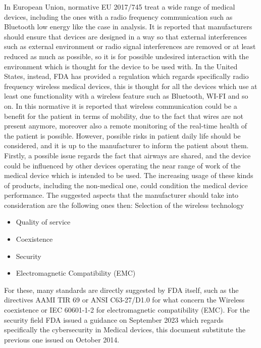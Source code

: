 \documentclass{Configuration_Files/PoliMi3i_thesis}
\begin{document}
In European Union, normative EU 2017/745 \cite{RegolamentoUE20172017} treat a wide range of medical devices, including the ones with a radio frequency communication such as Bluetooth low energy like the case in analysis. It is reported that manufacturers should ensure that devices are designed in a way so that external interferences such as external environment or radio signal interferences are removed or at least reduced as much as possible, so it is for possible undesired interaction with the environment which is thought for the device to be used with. 
In the United States, instead, FDA has provided a regulation \cite{healthWirelessMedicalDevices2023} which regards specifically radio frequency wireless medical devices, this is thought for all the devices which use at least one functionality with a wireless feature such as Bluetooth, WI-FI and so on. 
In this normative it is reported that wireless communication could be a benefit for the patient in terms of mobility, due to the fact that wires are not present anymore, moreover also a remote monitoring of the real-time health of the patient is possible. However, possible risks in patient daily life should be considered, and it is up to the manufacturer to inform the patient about them. Firstly, a possible issue regards the fact that airways are shared, and the device could be influenced by other devices operating the near range of work of the medical device which is intended to be used. The increasing usage of these kinds of products, including the non-medical one, could condition the medical device performance. The suggested aspects that the manufacturer should take into consideration are the following ones then:
Selection of the wireless technology 
\begin{itemize}

	\item Quality of service
	\item  Coexistence
	\item  Security
	\item  Electromagnetic Compatibility (EMC)

\end{itemize}
For these, many standards are directly suggested by FDA itself, such as the directives AAMI TIR 69 \cite{RecognizedConsensusStandards} or ANSI C63-27/D1.0 \cite{IEEEANSIC63} for what concern the Wireless coexistence or IEC 60601-1-2 \cite{IEC60601122014} for electromagnetic compatibility (EMC).
For the security field FDA issued a guidance \cite{healthCybersecurityMedicalDevices2023} on September 2023 which regards specifically the cybersecurity in Medical devices, this document substitute the previous one \cite{ContentPremarketSubmissions} issued on October 2014.
\end{document}
